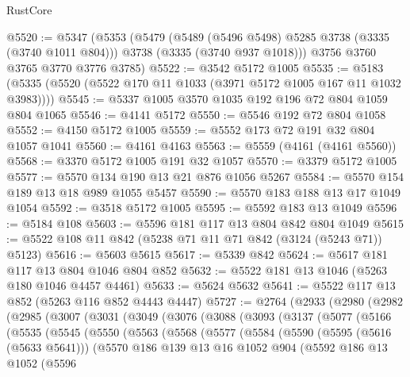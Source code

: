 \begin{lexlean}{RustCore}
\begin{coremodule}
@5520 := @5347
    (@5353
      (@5479
        (@5489 (@5496 @5498) @5285 @3738 (@3335 (@3740 @1011 @804)))
        @3738
        (@3335 (@3740 @937 @1018)))
      @3756
      @3760
      @3765
      @3770
      @3776
      @3785)
@5522 := @3542 @5172 @1005
@5535 := @5183 (@5335 (@5520 (@5522 @170 @11 @1033 (@3971 @5172 @1005 @167 @11 @1032 @3983))))
@5545 := @5337 @1005 @3570 @1035 @192 @196 @72 @804 @1059 @804 @1065
@5546 := @4141 @5172
@5550 := @5546 @192 @72 @804 @1058
@5552 := @4150 @5172 @1005
@5559 := @5552 @173 @72 @191 @32 @804 @1057 @1041
@5560 := @4161 @4163
@5563 := @5559 (@4161 (@4161 @5560))
@5568 := @3370 @5172 @1005 @191 @32 @1057
@5570 := @3379 @5172 @1005
@5577 := @5570 @134 @190 @13 @21 @876 @1056 @5267
@5584 := @5570 @154 @189 @13 @18 @989 @1055 @5457
@5590 := @5570 @183 @188 @13 @17 @1049 @1054
@5592 := @3518 @5172 @1005
@5595 := @5592 @183 @13 @1049
@5596 := @5184 @108
@5603 := @5596 @181 @117 @13 @804 @842 @804 @1049
@5615 := @5522 @108 @11 @842 (@5238 @71 @11 @71 @842 (@3124 (@5243 @71)) @5123)
@5616 := @5603 @5615
@5617 := @5339 @842
@5624 := @5617 @181 @117 @13 @804 @1046 @804 @852
@5632 := @5522 @181 @13 @1046 (@5263 @180 @1046 @4457 @4461)
@5633 := @5624 @5632
@5641 := @5522 @117 @13 @852 (@5263 @116 @852 @4443 @4447)
@5727 := @2764
    (@2933
      (@2980
        (@2982
          (@2985
            (@3007
              (@3031
                (@3049
                  (@3076
                    (@3088
                      (@3093
                        (@3137
                          (@5077
                            (@5166
                              (@5535
                                (@5545
                                  (@5550
                                    (@5563
                                      (@5568
                                        (@5577
                                          (@5584
                                            (@5590
                                              (@5595 (@5616 (@5633 @5641)))
                                              (@5570
                                                @186
                                                @139
                                                @13
                                                @16
                                                @1052
                                                @904
                                                (@5592
                                                  @186
                                                  @13
                                                  @1052
                                                  (@5596

\end{coremodule}
\end{lexlean}
